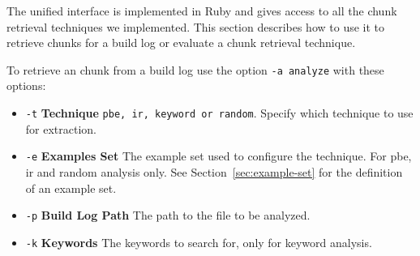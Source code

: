 \documentclass[\myrootdir/main.tex]{subfiles}
\begin{document}


The unified interface is implemented in Ruby and gives access to all the chunk retrieval techniques we implemented.
This section describes how to use it to retrieve chunks for a build log or evaluate a chunk retrieval technique.

To retrieve an chunk from a build log use the option \texttt{-a analyze} with these options:
\begin{itemize}
    \item \texttt{-t} \textbf{Technique} \texttt{pbe, ir, keyword or random}. Specify which technique to use for extraction.
    \item \texttt{-e} \textbf{Examples Set} The example set used to configure the technique. For pbe, ir and random analysis only. See Section~\ref{sec:example-set} for the definition of an example set.
    \item \texttt{-p} \textbf{Build Log Path} The path to the file to be analyzed.
    \item \texttt{-k} \textbf{Keywords} The keywords to search for, only for keyword analysis.
\end{itemize}
\end{document}
